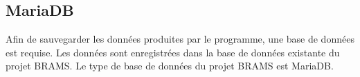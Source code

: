 \documentclass[11pt]{article}
\begin{document}

\subsection{MariaDB}

Afin de sauvegarder les données produites par le programme, une base de données est requise.
Les données sont enregistrées dans la base de données existante du projet BRAMS.
Le type de base de données du projet BRAMS est MariaDB.

\newpage
\end{document}

